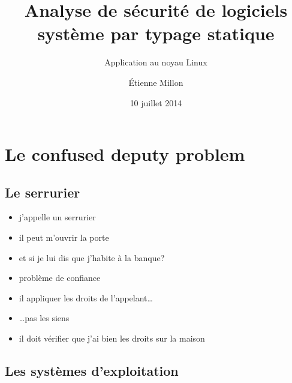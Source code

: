 \documentclass{beamer}
\title{Analyse de sécurité de logiciels système par typage statique}
\subtitle{Application au noyau Linux}
\author{Étienne Millon}
\date{10 juillet 2014}
\begin{document}

\frame{\titlepage}

\frame{\tableofcontents}

\section{Le confused deputy problem} %

\subsection{Le serrurier}

\begin{frame}

\begin{itemize}
\item
  j'appelle un serrurier
\item
  il peut m'ouvrir la porte
\item
  et si je lui dis que j'habite à la banque?
\end{itemize}

\end{frame}
\begin{frame}

\begin{itemize}
\item problème de confiance
\item il appliquer les droits de l'appelant…
\item …pas les siens
\item il doit vérifier que j'ai bien les droits sur la maison
\end{itemize}

\end{frame}

\subsection{Les systèmes d'exploitation}
\end{document}

